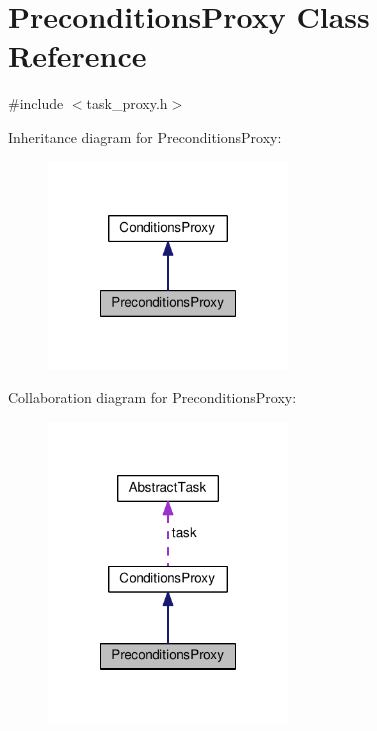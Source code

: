 \hypertarget{classPreconditionsProxy}{\section{Preconditions\-Proxy Class Reference}
\label{classPreconditionsProxy}
}


{\ttfamily \#include $<$task\-\_\-proxy.\-h$>$}



Inheritance diagram for Preconditions\-Proxy\-:
\nopagebreak
\begin{figure}[H]
\begin{center}
\leavevmode
\includegraphics[width=180pt]{classPreconditionsProxy__inherit__graph}
\end{center}
\end{figure}


Collaboration diagram for Preconditions\-Proxy\-:
\nopagebreak
\begin{figure}[H]
\begin{center}
\leavevmode
\includegraphics[width=180pt]{classPreconditionsProxy__coll__graph}
\end{center}
\end{figure}
